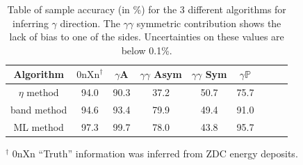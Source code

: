 \begin{table}[]
\centering
\begin{threeparttable}
\begin{tabular}{ccccccccc}
Algorithm & $\text{0nXn}^\dagger$ & $\gamma$A & $\gamma\gamma$ Asym & $\gamma\gamma$ Sym & $\gamma \mathbb{P}$\\
\toprule
$\eta$ method & 94.0 & 90.3 & 37.2 & 50.7 & 75.7 \\ 
band method & 94.6 & 93.4 & 79.9 & 49.4 & 91.0 \\ 
ML method & 97.3 & 99.7 & 78.0 & 43.8 & 95.7 \\ 

\end{tabular}
\begin{tablenotes}\small
\item
${}^\dagger$ 0nXn ``Truth'' information was inferred from ZDC energy deposits. 
\end{tablenotes}

\end{threeparttable}
\caption{Table of sample accuracy (in \%) for the 3 different algorithms for inferring $\gamma$ direction. The $\gamma\gamma$ symmetric contribution shows the lack of bias to one of the sides. Uncertainties on these values are below 0.1\%.}
\label{tab:SummaryOfResults}
\end{table}
